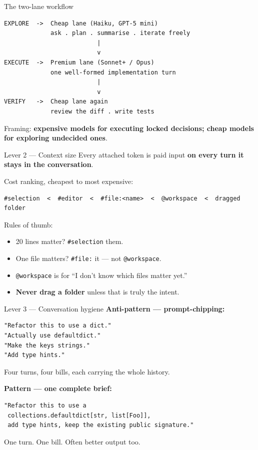 \documentclass[11pt,aspectratio=169]{beamer}
\newcommand{\hl}[1]{\textbf{\textcolor{accentblue}{#1}}}
\begin{document}
\begin{frame}[fragile]{The two-lane workflow}
\begin{lstlisting}
EXPLORE  ->  Cheap lane (Haiku, GPT-5 mini)
             ask . plan . summarise . iterate freely
                          |
                          v
EXECUTE  ->  Premium lane (Sonnet+ / Opus)
             one well-formed implementation turn
                          |
                          v
VERIFY   ->  Cheap lane again
             review the diff . write tests
\end{lstlisting}
  \vfill
  Framing: \hl{expensive models for executing locked decisions; cheap models for exploring undecided ones}.
\end{frame}

\begin{frame}[fragile]{Lever 2 --- Context size}
  Every attached token is paid input \hl{on every turn it stays in the conversation}.

  \medskip
  Cost ranking, cheapest to most expensive:
\begin{lstlisting}
#selection  <  #editor  <  #file:<name>  <  @workspace  <  dragged folder
\end{lstlisting}

  \medskip
  Rules of thumb:
  \begin{itemize}
    \item 20 lines matter? \texttt{\#selection} them.
    \item One file matters? \texttt{\#file:} it --- not \texttt{@workspace}.
    \item \texttt{@workspace} is for ``I don't know which files matter yet.''
    \item \hl{Never drag a folder} unless that is truly the intent.
  \end{itemize}
\end{frame}

\begin{frame}[fragile]{Lever 3 --- Conversation hygiene}
  \textbf{Anti-pattern --- prompt-chipping:}
\begin{lstlisting}
"Refactor this to use a dict."
"Actually use defaultdict."
"Make the keys strings."
"Add type hints."
\end{lstlisting}
  Four turns, four bills, each carrying the whole history.

  \medskip
  \textbf{Pattern --- one complete brief:}
\begin{lstlisting}
"Refactor this to use a
 collections.defaultdict[str, list[Foo]],
 add type hints, keep the existing public signature."
\end{lstlisting}
  One turn. One bill. Often better output too.
\end{frame}
\end{document}
